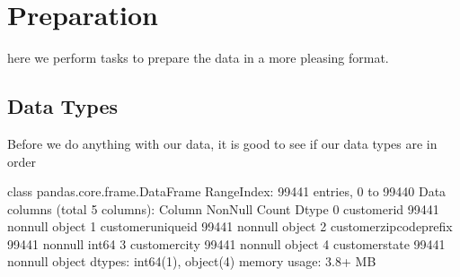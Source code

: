 \documentclass[letterpaper,10pt,english]{jupyterBook}
\begin{document}
\section{Preparation}
\label{\detokenize{c7_case_studies/Olist:preparation}}
\sphinxAtStartPar
here we perform tasks to prepare the data in a more pleasing format.


\subsection{Data Types}
\label{\detokenize{c7_case_studies/Olist:data-types}}
\sphinxAtStartPar
Before we do anything with our data, it is good to see if our data types are in order

\begin{sphinxVerbatim}[commandchars=\\\{\}]
\end{sphinxVerbatim}

\begin{sphinxVerbatim}[commandchars=\\\{\}]
\PYGZlt{}class \PYGZsq{}pandas.core.frame.DataFrame\PYGZsq{}\PYGZgt{}
RangeIndex: 99441 entries, 0 to 99440
Data columns (total 5 columns):
 \PYGZsh{}   Column                    Non\PYGZhy{}Null Count  Dtype 
\PYGZhy{}\PYGZhy{}\PYGZhy{}  \PYGZhy{}\PYGZhy{}\PYGZhy{}\PYGZhy{}\PYGZhy{}\PYGZhy{}                    \PYGZhy{}\PYGZhy{}\PYGZhy{}\PYGZhy{}\PYGZhy{}\PYGZhy{}\PYGZhy{}\PYGZhy{}\PYGZhy{}\PYGZhy{}\PYGZhy{}\PYGZhy{}\PYGZhy{}\PYGZhy{}  \PYGZhy{}\PYGZhy{}\PYGZhy{}\PYGZhy{}\PYGZhy{} 
 0   customer\PYGZus{}id               99441 non\PYGZhy{}null  object
 1   customer\PYGZus{}unique\PYGZus{}id        99441 non\PYGZhy{}null  object
 2   customer\PYGZus{}zip\PYGZus{}code\PYGZus{}prefix  99441 non\PYGZhy{}null  int64 
 3   customer\PYGZus{}city             99441 non\PYGZhy{}null  object
 4   customer\PYGZus{}state            99441 non\PYGZhy{}null  object
dtypes: int64(1), object(4)
memory usage: 3.8+ MB
\end{sphinxVerbatim}

\begin{sphinxVerbatim}[commandchars=\\\{\}]
\PYG{p}{[}\PYG{p}{]}  \PYG{p}{[}\PYG{p}{]}
\PYG{p}{[}\PYG{p}{]}  \PYG{p}{[}\PYG{p}{]}
\end{sphinxVerbatim}
\end{document}
